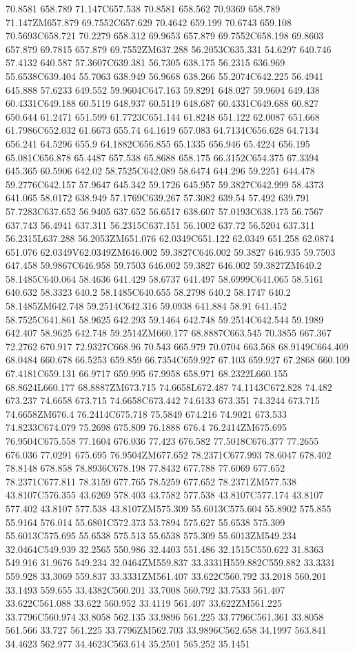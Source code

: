 70.8581 658.789 71.147C657.538 70.8581 658.562 70.9369 658.789 71.147ZM657.879 69.7552C657.629 70.4642 659.199 70.6743 659.108 70.5693C658.721 70.2279 658.312 69.9653 657.879 69.7552C658.198 69.8603 657.879 69.7815 657.879 69.7552ZM637.288 56.2053C635.331 54.6297 640.746 57.4132 640.587 57.3607C639.381 56.7305 638.175 56.2315 636.969 55.6538C639.404 55.7063 638.949 56.9668 638.266 55.2074C642.225 56.4941 645.888 57.6233 649.552 59.9604C647.163 59.8291 648.027 59.9604 649.438 60.4331C649.188 60.5119 648.937 60.5119 648.687 60.4331C649.688 60.827 650.644 61.2471 651.599 61.7723C651.144 61.8248 651.122 62.0087 651.668 61.7986C652.032 61.6673 655.74 64.1619 657.083 64.7134C656.628 64.7134 656.241 64.5296 655.9 64.1882C656.855 65.1335 656.946 65.4224 656.195 65.081C656.878 65.4487 657.538 65.8688 658.175 66.3152C654.375 67.3394 645.365 60.5906 642.02 58.7525C642.089 58.6474 644.296 59.2251 644.478 59.2776C642.157 57.9647 645.342 59.1726 645.957 59.3827C642.999 58.4373 641.065 58.0172 638.949 57.1769C639.267 57.3082 639.54 57.492 639.791 57.7283C637.652 56.9405 637.652 56.6517 638.607 57.0193C638.175 56.7567 637.743 56.4941 637.311 56.2315C637.151 56.1002 637.72 56.5204 637.311 56.2315L637.288 56.2053ZM651.076 62.0349C651.122 62.0349 651.258 62.0874 651.076 62.0349V62.0349ZM646.002 59.3827C646.002 59.3827 646.935 59.7503 647.458 59.9867C646.958 59.7503 646.002 59.3827 646.002 59.3827ZM640.2 58.1485C640.064 58.4636 641.429 58.6737 641.497 58.6999C641.065 58.5161 640.632 58.3323 640.2 58.1485C640.655 58.2798 640.2 58.1747 640.2 58.1485ZM642.748 59.2514C642.316 59.0938 641.884 58.91 641.452 58.7525C641.861 58.9625 642.293 59.1464 642.748 59.2514C642.544 59.1989 642.407 58.9625 642.748 59.2514ZM660.177 68.8887C663.545 70.3855 667.367 72.2762 670.917 72.9327C668.96 70.543 665.979 70.0704 663.568 68.9149C664.409 68.0484 660.678 66.5253 659.859 66.7354C659.927 67.103 659.927 67.2868 660.109 67.4181C659.131 66.9717 659.995 67.9958 658.971 68.2322L660.155 68.8624L660.177 68.8887ZM673.715 74.6658L672.487 74.1143C672.828 74.482 673.237 74.6658 673.715 74.6658C673.442 74.6133 673.351 74.3244 673.715 74.6658ZM676.4 76.2414C675.718 75.5849 674.216 74.9021 673.533 74.8233C674.079 75.2698 675.809 76.1888 676.4 76.2414ZM675.695 76.9504C675.558 77.1604 676.036 77.423 676.582 77.5018C676.377 77.2655 676.036 77.0291 675.695 76.9504ZM677.652 78.2371C677.993 78.6047 678.402 78.8148 678.858 78.8936C678.198 77.8432 677.788 77.6069 677.652 78.2371C677.811 78.3159 677.765 78.5259 677.652 78.2371ZM577.538 43.8107C576.355 43.6269 578.403 43.7582 577.538 43.8107C577.174 43.8107 577.402 43.8107 577.538 43.8107ZM575.309 55.6013C575.604 55.8902 575.855 55.9164 576.014 55.6801C572.373 53.7894 575.627 55.6538 575.309 55.6013C575.695 55.6538 575.513 55.6538 575.309 55.6013ZM549.234 32.0464C549.939 32.2565 550.986 32.4403 551.486 32.1515C550.622 31.8363 549.916 31.9676 549.234 32.0464ZM559.837 33.3331H559.882C559.882 33.3331 559.928 33.3069 559.837 33.3331ZM561.407 33.622C560.792 33.2018 560.201 33.1493 559.655 33.4382C560.201 33.7008 560.792 33.7533 561.407 33.622C561.088 33.622 560.952 33.4119 561.407 33.622ZM561.225 33.7796C560.974 33.8058 562.135 33.9896 561.225 33.7796C561.361 33.8058 561.566 33.727 561.225 33.7796ZM562.703 33.9896C562.658 34.1997 563.841 34.4623 562.977 34.4623C563.614 35.2501 565.252 35.1451 